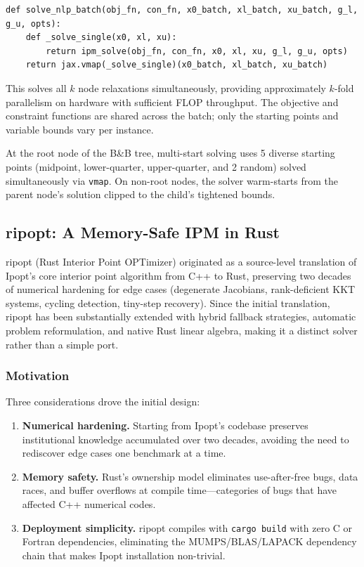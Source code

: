 \documentclass[12pt,preprint]{article}
\begin{document}
\begin{verbatim}
def solve_nlp_batch(obj_fn, con_fn, x0_batch, xl_batch, xu_batch, g_l, g_u, opts):
    def _solve_single(x0, xl, xu):
        return ipm_solve(obj_fn, con_fn, x0, xl, xu, g_l, g_u, opts)
    return jax.vmap(_solve_single)(x0_batch, xl_batch, xu_batch)
\end{verbatim}

This solves all $k$ node relaxations simultaneously, providing approximately $k$-fold parallelism on hardware with sufficient FLOP throughput. The objective and constraint functions are shared across the batch; only the starting points and variable bounds vary per instance.


At the root node of the B\&B tree, multi-start solving uses 5 diverse starting points (midpoint, lower-quarter, upper-quarter, and 2 random) solved simultaneously via \texttt{vmap}. On non-root nodes, the solver warm-starts from the parent node's solution clipped to the child's tightened bounds.

\subsection{ripopt: A Memory-Safe IPM in Rust}
\label{sec-ripopt}

ripopt (Rust Interior Point OPTimizer) originated as a source-level translation of Ipopt's core interior point algorithm from C++ to Rust, preserving two decades of numerical hardening for edge cases (degenerate Jacobians, rank-deficient KKT systems, cycling detection, tiny-step recovery). Since the initial translation, ripopt has been substantially extended with hybrid fallback strategies, automatic problem reformulation, and native Rust linear algebra, making it a distinct solver rather than a simple port.

\subsubsection{Motivation}
\label{org-motivation}
Three considerations drove the initial design:

\begin{enumerate}
\item \textbf{Numerical hardening.} Starting from Ipopt's codebase preserves institutional knowledge accumulated over two decades, avoiding the need to rediscover edge cases one benchmark at a time.

\item \textbf{Memory safety.} Rust's ownership model eliminates use-after-free bugs, data races, and buffer overflows at compile time---categories of bugs that have affected C++ numerical codes.

\item \textbf{Deployment simplicity.} ripopt compiles with \texttt{cargo build} with zero C or Fortran dependencies, eliminating the MUMPS/BLAS/LAPACK dependency chain that makes Ipopt installation non-trivial.
\end{enumerate}
\end{document}
